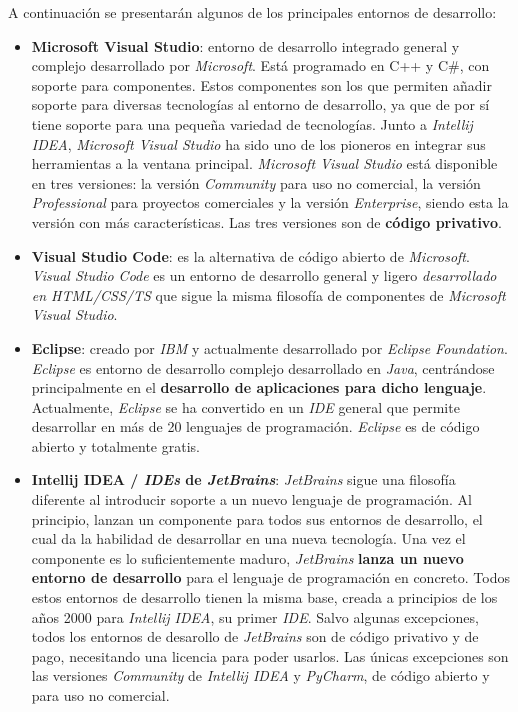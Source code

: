 A continuación se presentarán algunos de los principales
entornos de desarrollo:
\begin{itemize}
    \item \textbf{Microsoft Visual Studio}\cite{VISUALSTUDIO}: entorno de desarrollo
    integrado general y complejo desarrollado por \textit{Microsoft}.
    Está programado en C++ y C\#, con soporte para componentes.
    Estos componentes son los que permiten añadir soporte para diversas tecnologías
    al entorno de desarrollo, ya que de por sí tiene soporte para una pequeña
    variedad de tecnologías.
    Junto a \textit{Intellij IDEA}, \textit{Microsoft Visual Studio} ha sido uno
    de los pioneros en integrar sus herramientas a la ventana principal.
    \textit{Microsoft Visual Studio} está disponible en tres versiones: la versión
    \textit{Community} para uso no comercial, la versión \textit{Professional} para
    proyectos comerciales y la versión \textit{Enterprise}, siendo esta la versión
    con más características.
    Las tres versiones son de \textbf{código privativo}.
    \item \textbf{Visual Studio Code}\cite{VISUALSTUDIOCODE}:
    es la alternativa de código abierto de \textit{Microsoft}.
    \textit{Visual Studio Code} es un entorno de desarrollo general
    y ligero \textit{desarrollado en HTML/CSS/TS} que sigue la misma filosofía
    de componentes de \textit{Microsoft Visual Studio}.
    \item \textbf{Eclipse}\cite{ECLIPSE}: creado por \textit{IBM} y actualmente
    desarrollado por \textit{Eclipse Foundation}.
    \textit{Eclipse} es entorno de desarrollo complejo desarrollado en \textit{Java},
    centrándose principalmente en el \textbf{desarrollo de aplicaciones para dicho lenguaje}.
    Actualmente, \textit{Eclipse} se ha convertido en un \textit{IDE} general que
    permite desarrollar en más de 20 lenguajes de programación.
    \textit{Eclipse} es de código abierto y totalmente gratis.
    \item \textbf{Intellij IDEA / \textit{IDEs} de \textit{JetBrains}}\cite{INTELLIJIDEA}:
    \textit{JetBrains} sigue una filosofía diferente al introducir
    soporte a un nuevo lenguaje de programación.
    Al principio, lanzan un componente para todos sus entornos de desarrollo,
    el cual da la habilidad de desarrollar en una nueva tecnología.
    Una vez el componente es lo suficientemente maduro, \textit{JetBrains}
    \textbf{lanza un nuevo entorno de desarrollo} para el lenguaje de programación
    en concreto.
    Todos estos entornos de desarrollo tienen la misma base, creada a
    principios de los años 2000 para \textit{Intellij IDEA}, su primer \textit{IDE}.
    Salvo algunas excepciones, todos los entornos de desarollo de \textit{JetBrains}
    son de código privativo y de pago, necesitando una licencia para poder usarlos.
    Las únicas excepciones son las versiones \textit{Community} de \textit{Intellij IDEA}
    y \textit{PyCharm}, de código abierto y para uso no comercial.
\end{itemize}
